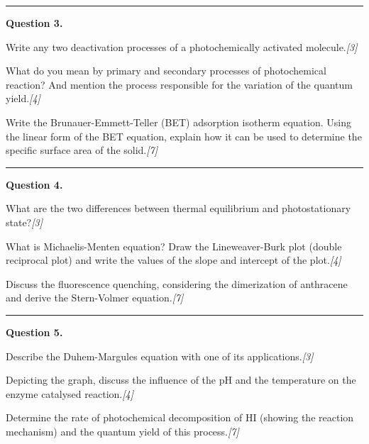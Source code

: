 \documentclass[11pt,a4paper]{article}
\newcommand{\pts}[1]{\hfill   \textit{[#1]}}
\begin{document}
\medskip\rule{\linewidth}{0.2pt}\medskip




\noindent   \textbf{Question 3.}

\begin{parts}
  \item Write any two deactivation processes of a photochemically activated molecule.\pts{3}
  \item What do you mean by primary and secondary processes of photochemical reaction? And mention the process responsible for the variation of the quantum yield.\pts{4}
  \item Write the Brunauer-Emmett-Teller (BET) adsorption isotherm equation. Using the linear form of the BET equation, explain how it can be used to determine the specific surface area of the solid.\pts{7}
\end{parts}

\medskip\rule{\linewidth}{0.2pt}\medskip




\noindent   \textbf{Question 4.}

\begin{parts}
  \item What are the two differences between thermal equilibrium and photostationary state?\pts{3}
  \item What is Michaelis-Menten equation? Draw the Lineweaver-Burk plot (double reciprocal plot) and write the values of the slope and intercept of the plot.\pts{4}
  \item Discuss the fluorescence quenching, considering the dimerization of anthracene and derive the Stern-Volmer equation.\pts{7}
\end{parts}

\medskip\rule{\linewidth}{0.2pt}\medskip




\noindent   \textbf{Question 5.}

\begin{parts}
  \item Describe the Duhem-Margules equation with one of its applications.\pts{3}
  \item Depicting the graph, discuss the influence of the pH and the temperature on the enzyme catalysed reaction.\pts{4}
  \item Determine the rate of photochemical decomposition of $ \text{HI}$ (showing the reaction mechanism) and the quantum yield of this process.\pts{7}
\end{parts}
\end{document}
